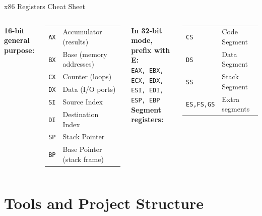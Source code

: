 \documentclass[aspectratio=169]{beamer}
\begin{document}
\begin{frame}{x86 Registers Cheat Sheet}
  \begin{columns}
    \textbf{16-bit general purpose:}\\[4pt]
    \begin{tabular}{ll}
      \texttt{AX} & Accumulator (results)\\
      \texttt{BX} & Base (memory addresses)\\
      \texttt{CX} & Counter (loops)\\
      \texttt{DX} & Data (I/O ports)\\
      \texttt{SI} & Source Index\\
      \texttt{DI} & Destination Index\\
      \texttt{SP} & Stack Pointer\\
      \texttt{BP} & Base Pointer (stack frame)\\
    \end{tabular}
    \textbf{In 32-bit mode, prefix with E:}\\[4pt]
    \texttt{EAX, EBX, ECX, EDX, ESI, EDI, ESP, EBP}\\[8pt]
    \textbf{Segment registers:}\\[4pt]
    \begin{tabular}{ll}
      \texttt{CS} & Code Segment\\
      \texttt{DS} & Data Segment\\
      \texttt{SS} & Stack Segment\\
      \texttt{ES,FS,GS} & Extra segments\\
    \end{tabular}
  \end{columns}
\end{frame}

\section{Tools and Project Structure}
\end{document}
